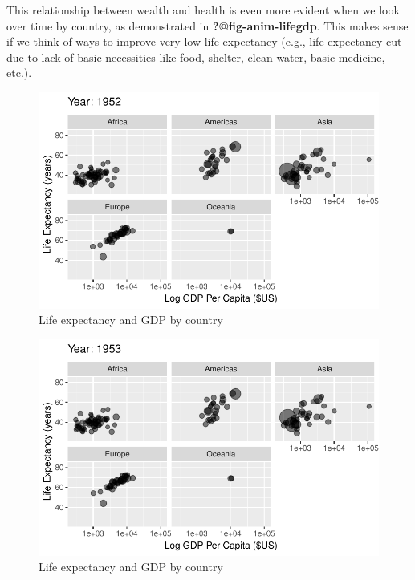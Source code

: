 \documentclass[
  letterpaper,
  DIV=11,
  numbers=noendperiod]{scrreport}
\theoremstyle{definition}
\theoremstyle{remark}
\begin{document}
This relationship between wealth and health is even more evident when we
look over time by country, as demonstrated in
\textbf{?@fig-anim-lifegdp}. This makes sense if we think of ways to
improve very low life expectancy (e.g., life expectancy cut due to lack
of basic necessities like food, shelter, clean water, basic medicine,
etc.).

\begin{figure}

{\centering \includegraphics{index_files/figure-pdf/fig-anim-lifegdp-1.pdf}

}

\caption{\label{fig-anim-lifegdp-1}Life expectancy and GDP by country}

\end{figure}

\begin{figure}

{\centering \includegraphics{index_files/figure-pdf/fig-anim-lifegdp-2.pdf}

}

\caption{\label{fig-anim-lifegdp-2}Life expectancy and GDP by country}

\end{figure}
\end{document}
